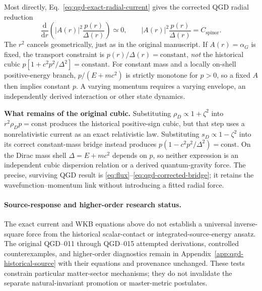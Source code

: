 \documentclass[11pt,a4paper]{article}
\newcommand{\dd}{\mathrm d}
\begin{document}
Most directly, Eq.~\eqref{eq:qgd-exact-radial-current} gives the corrected QGD radial reduction
\begin{equation}\label{eq:qgd-corrected-bridge}
\boxed{\quad
\frac{\dd}{\dd r}\left(|A(r)|^2\frac{p(r)}{\Delta(r)}\right)\simeq0,
\qquad |A(r)|^2\frac{p(r)}{\Delta(r)}=C_{\mathrm{spinor}}.
\quad}
\end{equation}
The $r^2$ cancels geometrically, just as in the original manuscript.  If $A(r)=\alpha_G$ is fixed, the transport constraint is $p(r)/\Delta(r)=\text{constant}$, \emph{not} the historical cubic $p[1+c^2p^2/\Delta^2]=\text{constant}$.  For constant mass and a locally on-shell positive-energy branch, $p/(E+mc^2)$ is strictly monotone for $p>0$, so a fixed $A$ then implies constant $p$.  A varying momentum requires a varying envelope, an independently derived interaction or other state dynamics.

\noindent\textbf{What remains of the original cubic.}
Substituting $\rho_D\propto1+\zeta^2$ into $r^2\rho_Dp=\mathrm{const}$ produces the historical positive-sign cubic, but that step uses a nonrelativistic current as an exact relativistic law.  Substituting $s_D\propto1-\zeta^2$ into its correct constant-mass bridge instead produces $p(1-c^2p^2/\Delta^2)=\mathrm{const}$.  On the Dirac mass shell $\Delta=E+mc^2$ depends on $p$, so neither expression is an independent cubic dispersion relation or a derived quantum-gravity force.  The precise, surviving QGD result is \eqref{eq:flux}--\eqref{eq:qgd-corrected-bridge}; it retains the wavefunction--momentum link without introducing a fitted radial force.

\paragraph{Source-response and higher-order research status.}
The exact current and WKB equations above do not establish a universal inverse-square force from the historical scalar-contact or integrated-source-energy ansatz. The original QGD--011 through QGD--015 attempted derivations, controlled counterexamples, and higher-order diagnostics remain in Appendix~\ref{app:qgd-historical-source} with their equations and provenance unchanged. These tests constrain particular matter-sector mechanisms; they do not invalidate the separate natural-invariant promotion or master-metric postulates.
\end{document}
